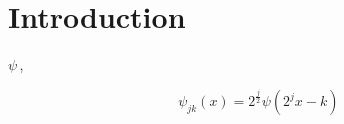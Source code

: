 \chapter{Introduction}
\label{chap:introduction}


\(\scriptstyle \psi\,\),

\[\psi_{jk}(x) = 2^\frac{j}{2} \psi\left(2^jx - k\right)\,\]

